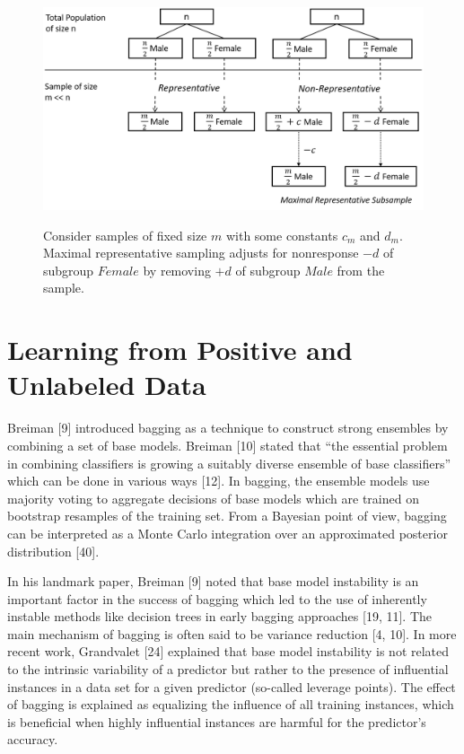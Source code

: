 \begin{figure}[ht]
	\begin{center}
		\includegraphics[scale=0.54,angle=0]{fig/Representative}
		\label{representativ}
		\caption{Consider samples of fixed size \(m\) with some constants \(c_m\) and \(d_m\). Maximal representative sampling adjusts for nonresponse \(-d\) of subgroup \(Female\) by removing \(+d\) of subgroup \(Male\) from the sample.}
	\end{center}
\end{figure}

\section{Learning from Positive and Unlabeled Data}

Breiman [9] introduced bagging as a technique to construct strong ensembles by combining a set of base models. Breiman [10] stated that “the essential problem in combining classiﬁers is growing a suitably diverse ensemble of base classiﬁers” which can be done in various ways [12]. In bagging, the ensemble models use majority voting to aggregate decisions of base models which are trained on bootstrap resamples of the training set. From a Bayesian point of view, bagging can be interpreted as a Monte Carlo integration over an approximated posterior distribution [40]. 

In his landmark paper, Breiman [9] noted that base model instability is an important factor in the success of bagging which led to the use of inherently instable methods like decision trees in early bagging approaches [19, 11]. The main mechanism of bagging is often said to be variance reduction [4, 10]. In more recent work, Grandvalet [24] explained that base model instability is not related to the intrinsic variability of a predictor but rather to the presence of inﬂuential instances in a data set for a given predictor (so-called leverage points).
The eﬀect of bagging is explained as equalizing the inﬂuence of all training instances, which is beneﬁcial when highly inﬂuential instances are harmful for the predictor’s accuracy.

